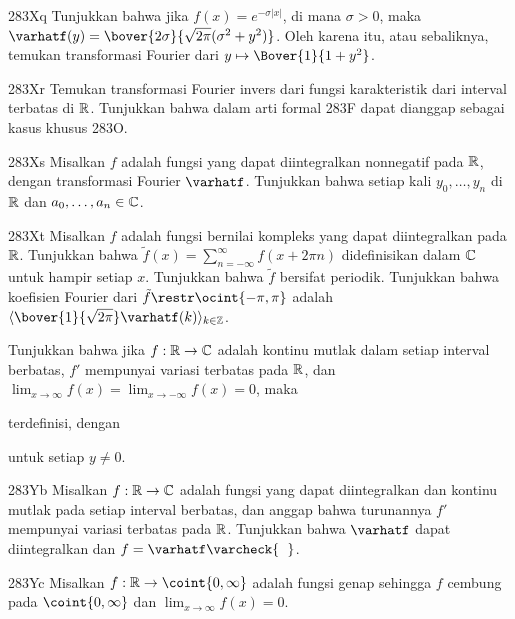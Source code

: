 {\sqheader 283Xq Tunjukkan bahwa jika $f(x)=e^{-\sigma|x|}$, di mana
$\sigma>0$, maka
$\varhatf(y)=\bover{2\sigma}{\sqrt{2\pi}(\sigma^2+y^2)}$.
Oleh karena itu, atau sebaliknya, temukan transformasi Fourier dari
$y\mapsto\Bover{1}{1+y^2}$.

\spheader 283Xr Temukan transformasi Fourier invers dari fungsi karakteristik
dari interval terbatas di $\Bbb R$.   Tunjukkan bahwa
dalam arti formal 283F dapat dianggap sebagai kasus khusus 283O.

\spheader 283Xs Misalkan $f$ adalah fungsi yang dapat diintegralkan nonnegatif pada
$\Bbb R$, dengan transformasi Fourier $\varhatf$.   Tunjukkan bahwa
setiap kali $y_0,\ldots,y_n$ di
$\Bbb R$ dan $a_0,\ldots,a_n\in\Bbb C$.

\spheader 283Xt Misalkan $f$ adalah fungsi bernilai kompleks yang dapat diintegralkan pada
$\Bbb R$.   Tunjukkan bahwa $\tilde f(x)=\sum_{n=-\infty}^{\infty}f(x+2\pi n)$
didefinisikan dalam $\Bbb C$ untuk hampir setiap $x$.
   Tunjukkan bahwa $\tilde f$ bersifat periodik.   Tunjukkan bahwa koefisien Fourier
dari $\tilde f\restr\ocint{-\pi,\pi}$ adalah
$\langle\bover{1}{\sqrt{2\pi}}\varhatf(k)\rangle_{k\in\Bbb Z}$.

Tunjukkan bahwa jika $f:\Bbb R\to\Bbb C$ adalah
kontinu mutlak dalam setiap interval berbatas, $f'$ mempunyai variasi
terbatas pada $\Bbb R$, dan
$\lim_{x\to\infty}f(x)=\lim_{x\to-\infty}f(x)=0$, maka


\noindent terdefinisi, dengan


\noindent untuk setiap $y\ne 0$.

\spheader 283Yb Misalkan $f:\Bbb R\to\Bbb C$ adalah fungsi
yang dapat diintegralkan dan kontinu mutlak pada setiap interval berbatas, dan
anggap bahwa turunannya $f'$ mempunyai variasi terbatas pada $\Bbb R$.
Tunjukkan bahwa $\varhatf$ dapat diintegralkan dan
$f=\varhatf\varcheck{\phantom{f}}$.   

\spheader 283Yc Misalkan $f:\Bbb R\to\coint{0,\infty}$ adalah fungsi
genap sehingga $f$ cembung pada $\coint{0,\infty}$
dan $\lim_{x\to\infty}f(x)=0$.

}

